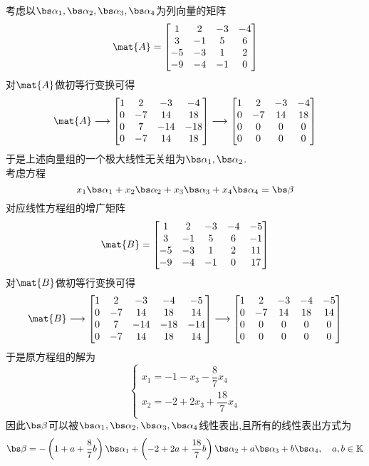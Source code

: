 \documentclass{ctexart}
\begin{document}
\begin{solution}
    考虑以$\bs\alpha_1,\bs\alpha_2,\bs\alpha_3,\bs\alpha_4$为列向量的矩阵
    \[\mat{A}=\begin{bmatrix}
        1 & 2 & -3 & -4\\
        3 & -1 & 5 & 6\\
        -5 & -3 & 1 & 2\\
        -9 & -4 & -1 & 0
    \end{bmatrix}\]
    对$\mat{A}$做初等行变换可得
    \[\mat{A}\longrightarrow\begin{bmatrix}
        1&2&-3&-4\\
        0&-7&14&18\\
        0&7&-14&-18\\
        0&-7&14&18
    \end{bmatrix}\longrightarrow\begin{bmatrix}
        1&2&-3&-4\\
        0&-7&14&18\\
        0&0&0&0\\
        0&0&0&0
    \end{bmatrix}\]
    于是上述向量组的一个极大线性无关组为$\bs\alpha_1,\bs\alpha_2$.\\
    \indent 考虑方程
    \[x_1\bs\alpha_1+x_2\bs\alpha_2+x_3\bs\alpha_3+x_4\bs\alpha_4=\bs\beta\]
    对应线性方程组的增广矩阵
    \[\mat{B}=\begin{bmatrix}
        1 & 2 & -3 & -4&-5\\
        3 & -1 & 5 & 6&-1\\
        -5 & -3 & 1 & 2&11\\
        -9 & -4 & -1 & 0&17
    \end{bmatrix}\]
    对$\mat{B}$做初等行变换可得
    \[\mat{B}\longrightarrow\begin{bmatrix}
        1&2&-3&-4&-5\\
        0&-7&14&18&14\\
        0&7&-14&-18&-14\\
        0&-7&14&18&14
    \end{bmatrix}\longrightarrow\begin{bmatrix}
        1&2&-3&-4&-5\\
        0&-7&14&18&14\\
        0&0&0&0&0\\
        0&0&0&0&0
    \end{bmatrix}\]
    于是原方程组的解为
    \[\left\{\begin{array}{l}
        x_1=-1-x_3-\dfrac{8}{7}x_4\\
        x_2=-2+2x_3+\dfrac{18}{7}x_4\\
    \end{array}\right.\]
    因此$\bs\beta$可以被$\bs\alpha_1,\bs\alpha_2,\bs\alpha_3,\bs\alpha_4$线性表出,且所有的线性表出方式为
    \[\bs\beta=-\left(1+a+\dfrac{8}{7}b\right)\bs\alpha_1+\left(-2+2a+\dfrac{18}{7}b\right)\bs\alpha_2+a\bs\alpha_3+b\bs\alpha_4,\quad a,b\in\mathbb{K}\]
\end{solution}
\end{document}
